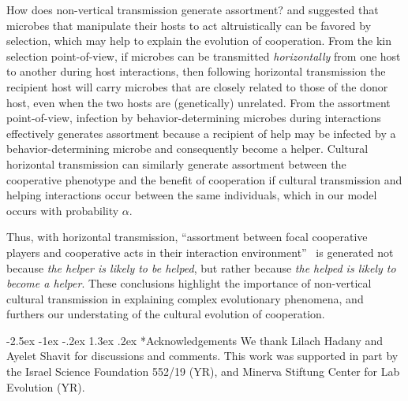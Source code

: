 \documentclass[12pt]{extarticle}
\makeatletter
\renewcommand\section{\@startsection {section}{1}{\z@}%
     {-2.5ex \@plus -1ex \@minus -.2ex}%
     {1.3ex \@plus.2ex}%
    {\Large\bfseries}}
\makeatother
\begin{document}
{How does non-vertical transmission generate assortment? 
\citet{lewin2017microbes} and \citet{lewin2020rockpaperscissors} 
suggested that microbes that manipulate their hosts to act altruistically can be favored by selection, which may help to explain the evolution of cooperation. 
From the kin selection point-of-view, if microbes can be transmitted \emph{horizontally} from one host to another during host interactions, then following horizontal transmission the recipient host will carry microbes that are closely related to those of the donor host, 
even when the two hosts are (genetically) unrelated. 
From the assortment point-of-view,
infection by behavior-determining microbes during interactions effectively generates assortment because a recipient of help may be infected by a behavior-determining microbe and consequently become a helper.
Cultural horizontal transmission can similarly generate assortment between the cooperative phenotype and the benefit of cooperation if cultural transmission and helping interactions occur between the same individuals, which in our model occurs with probability $\alpha$. 

Thus, with horizontal transmission, ``assortment between focal cooperative players and cooperative acts in their interaction
environment''~\citep{Fletcher2009assortment} is generated not because \emph{the helper is likely to be helped}, but rather because \emph{the helped is likely to become a helper}.
These conclusions highlight the importance of non-vertical cultural transmission in explaining complex evolutionary phenomena, and  furthers our understating of the cultural evolution of cooperation. 



{\small
\section*{Acknowledgements}
We thank Lilach Hadany and Ayelet Shavit for discussions and comments.
This work was supported in part by
the Israel Science Foundation 552/19 (YR),
and Minerva Stiftung Center for Lab Evolution (YR).
}



}
\end{document}
